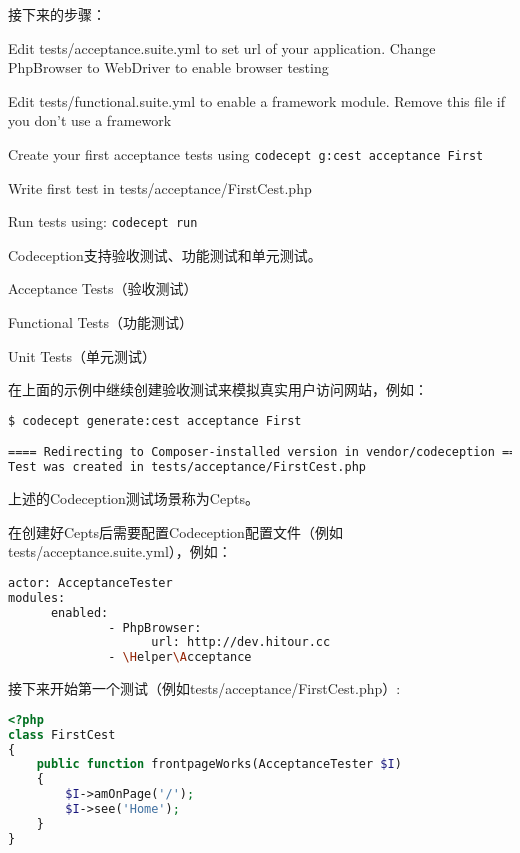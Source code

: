 接下来的步骤：

\begin{compactenum}
\item Edit tests/acceptance.suite.yml to set url of your application. Change PhpBrowser to WebDriver to enable browser testing
\item Edit tests/functional.suite.yml to enable a framework module. Remove this file if you don't use a framework
\item Create your first acceptance tests using \texttt{codecept g:cest acceptance First}
\item Write first test in tests/acceptance/FirstCest.php
\item Run tests using: \texttt{codecept run}
\end{compactenum}

Codeception支持验收测试、功能测试和单元测试。

\begin{compactitem}
\item Acceptance Tests（验收测试）
\item Functional Tests（功能测试）
\item Unit Tests（单元测试）
\end{compactitem}

在上面的示例中继续创建验收测试来模拟真实用户访问网站，例如：


\begin{lstlisting}[language=bash]
$ codecept generate:cest acceptance First

==== Redirecting to Composer-installed version in vendor/codeception ====
Test was created in tests/acceptance/FirstCest.php
\end{lstlisting}

上述的Codeception测试场景称为Cepts。

在创建好Cepts后需要配置Codeception配置文件（例如tests/acceptance.suite.yml），例如：

\begin{lstlisting}[language=bash]
actor: AcceptanceTester
modules:
      enabled:
              - PhpBrowser:
                    url: http://dev.hitour.cc
              - \Helper\Acceptance
\end{lstlisting}

接下来开始第一个测试（例如tests/acceptance/FirstCest.php）:

\begin{lstlisting}[language=PHP]
<?php
class FirstCest 
{
    public function frontpageWorks(AcceptanceTester $I)
    {
        $I->amOnPage('/');
        $I->see('Home');  
    }
}
\end{lstlisting}


